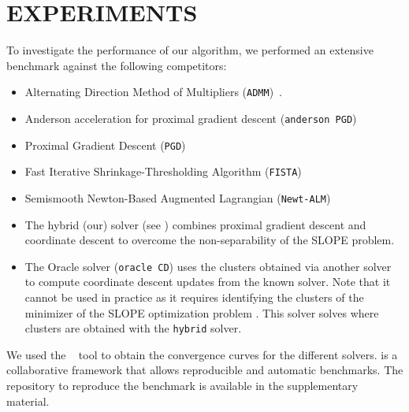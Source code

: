 \section{EXPERIMENTS}\label{sec:experiments}

To investigate the performance of our algorithm, we performed an extensive benchmark against the following competitors:
\begin{itemize}[noitemsep]
  \item Alternating Direction Method of Multipliers (\texttt{ADMM})~\parencite{boyd2010}. 
  \item Anderson acceleration for proximal gradient descent (\texttt{anderson PGD})~\parencite{zhang2020}
  \item Proximal Gradient Descent (\texttt{PGD})~\parencite{combettes2005}
  \item Fast Iterative Shrinkage-Thresholding Algorithm (\texttt{FISTA})~\parencite{beck2009}
  \item Semismooth Newton-Based Augmented Lagrangian (\texttt{Newt-ALM})~\parencite{Ziyan2019}

  \item The hybrid (our) solver (see ) combines proximal gradient descent
        and coordinate descent to overcome the non-separability of the SLOPE problem.
  \item The Oracle solver (\texttt{oracle CD}) uses the clusters obtained via another solver to compute coordinate descent updates from the known solver.
  Note that it cannot be used in practice as it requires identifying the clusters of the minimizer of the SLOPE optimization problem . This solver solves  where clusters are obtained with the \texttt{hybrid} solver.
\end{itemize}

We used the ~\parencite{moreau2022benchopt} tool to obtain the convergence curves for the different solvers.
 is a collaborative framework that allows reproducible and automatic benchmarks.
The repository to reproduce the benchmark is available in the supplementary material.

